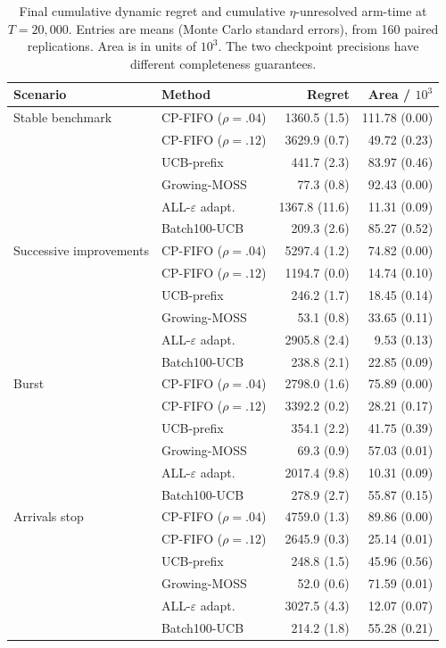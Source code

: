 \documentclass[11pt]{article}
\theoremstyle{remark}
\begin{document}
\begin{table}[t]
\centering
\caption{Final cumulative dynamic regret and cumulative $\eta$-unresolved arm-time at $T=20{,}000$. Entries are means (Monte Carlo standard errors), from 160 paired replications. Area is in units of $10^3$. The two checkpoint precisions have different completeness guarantees.}
\label{tab:simulation}
\small
\begin{tabular}{llrr}
\toprule
Scenario & Method & Regret & Area / $10^3$ \\
\midrule
Stable benchmark & CP-FIFO ($\rho=.04$) & 1360.5 (1.5) & 111.78 (0.00) \\
 & CP-FIFO ($\rho=.12$) & 3629.9 (0.7) & 49.72 (0.23) \\
 & UCB-prefix & 441.7 (2.3) & 83.97 (0.46) \\
 & Growing-MOSS & 77.3 (0.8) & 92.43 (0.00) \\
 & ALL-$\varepsilon$ adapt. & 1367.8 (11.6) & 11.31 (0.09) \\
 & Batch100-UCB & 209.3 (2.6) & 85.27 (0.52) \\
\midrule
Successive improvements & CP-FIFO ($\rho=.04$) & 5297.4 (1.2) & 74.82 (0.00) \\
 & CP-FIFO ($\rho=.12$) & 1194.7 (0.0) & 14.74 (0.10) \\
 & UCB-prefix & 246.2 (1.7) & 18.45 (0.14) \\
 & Growing-MOSS & 53.1 (0.8) & 33.65 (0.11) \\
 & ALL-$\varepsilon$ adapt. & 2905.8 (2.4) & 9.53 (0.13) \\
 & Batch100-UCB & 238.8 (2.1) & 22.85 (0.09) \\
\midrule
Burst & CP-FIFO ($\rho=.04$) & 2798.0 (1.6) & 75.89 (0.00) \\
 & CP-FIFO ($\rho=.12$) & 3392.2 (0.2) & 28.21 (0.17) \\
 & UCB-prefix & 354.1 (2.2) & 41.75 (0.39) \\
 & Growing-MOSS & 69.3 (0.9) & 57.03 (0.01) \\
 & ALL-$\varepsilon$ adapt. & 2017.4 (9.8) & 10.31 (0.09) \\
 & Batch100-UCB & 278.9 (2.7) & 55.87 (0.15) \\
\midrule
Arrivals stop & CP-FIFO ($\rho=.04$) & 4759.0 (1.3) & 89.86 (0.00) \\
 & CP-FIFO ($\rho=.12$) & 2645.9 (0.3) & 25.14 (0.01) \\
 & UCB-prefix & 248.8 (1.5) & 45.96 (0.56) \\
 & Growing-MOSS & 52.0 (0.6) & 71.59 (0.01) \\
 & ALL-$\varepsilon$ adapt. & 3027.5 (4.3) & 12.07 (0.07) \\
 & Batch100-UCB & 214.2 (1.8) & 55.28 (0.21) \\
\bottomrule
\end{tabular}
\end{table}
\end{document}
